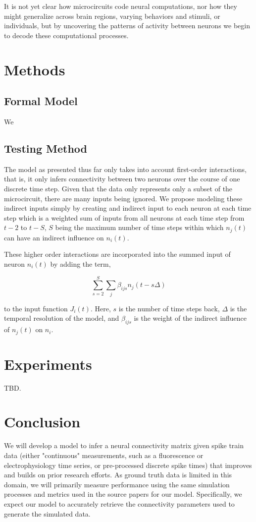 \documentclass{article}
\begin{document}
It is not yet clear how microcircuits code neural
computations, nor how they might generalize across brain regions, varying behaviors and stimuli, 
or individuals, but by uncovering the patterns of activity between
neurons we begin to decode these computational processes.

\section{Methods}

\subsection{Formal Model}
We 

\subsection{Testing Method}

The model as presented thus far only takes into account first-order interactions, that is, it only infers connectivity between two neurons over the course of one discrete time step. Given that the data only represents only a subset of the microcircuit, there are many inputs being ignored. We propose modeling these indirect inputs simply by creating and indirect input to each neuron at each time step which is a weighted sum of inputs from all neurons at each time step from $t-2$ to $t-S$, $S$ being the maximum number of time steps within which $n_j(t)$ can have an indirect influence on $n_i(t)$.

These higher order interactions are incorporated into the summed input of neuron $n_i(t)$ by adding the term,


\begin{equation}
\label{new_term}
\displaystyle\sum\limits_{s=2}^S\sum\limits_{j} \beta_{ijs}n_j(t-s\Delta)
\end{equation}


to the input function $J_i(t)$. Here, $s$ is the number of time steps back, $\Delta$ is the temporal resolution of the model, and $\beta_{ijs}$ is the weight of the indirect influence of $n_j(t)$ on $n_i$.

\section{Experiments}
TBD.

\section{Conclusion}
We will develop a model to infer a neural connectivity matrix given spike train data (either "continuous" measurements, such as a fluorescence or electrophysiology time series, or pre-processed discrete spike times) that improves and builds on prior research efforts. As ground truth data is limited in this domain, we will primarily measure performance using the same simulation processes and metrics used in the source papers for our model.  Specifically, we expect our model to accurately retrieve the connectivity parameters used to generate the simulated data.  
\end{document}
